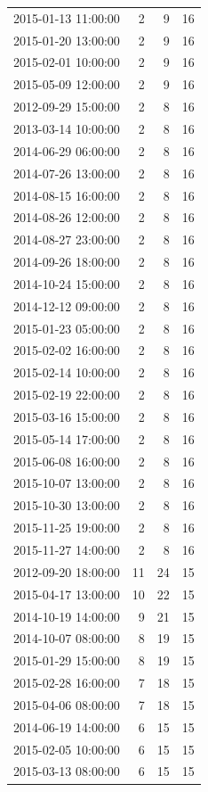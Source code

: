 \begin{tabular}{lrrr}
2015-01-13 11:00:00 & 2 & 9 & 16 \\
2015-01-20 13:00:00 & 2 & 9 & 16 \\
2015-02-01 10:00:00 & 2 & 9 & 16 \\
2015-05-09 12:00:00 & 2 & 9 & 16 \\
2012-09-29 15:00:00 & 2 & 8 & 16 \\
2013-03-14 10:00:00 & 2 & 8 & 16 \\
2014-06-29 06:00:00 & 2 & 8 & 16 \\
2014-07-26 13:00:00 & 2 & 8 & 16 \\
2014-08-15 16:00:00 & 2 & 8 & 16 \\
2014-08-26 12:00:00 & 2 & 8 & 16 \\
2014-08-27 23:00:00 & 2 & 8 & 16 \\
2014-09-26 18:00:00 & 2 & 8 & 16 \\
2014-10-24 15:00:00 & 2 & 8 & 16 \\
2014-12-12 09:00:00 & 2 & 8 & 16 \\
2015-01-23 05:00:00 & 2 & 8 & 16 \\
2015-02-02 16:00:00 & 2 & 8 & 16 \\
2015-02-14 10:00:00 & 2 & 8 & 16 \\
2015-02-19 22:00:00 & 2 & 8 & 16 \\
2015-03-16 15:00:00 & 2 & 8 & 16 \\
2015-05-14 17:00:00 & 2 & 8 & 16 \\
2015-06-08 16:00:00 & 2 & 8 & 16 \\
2015-10-07 13:00:00 & 2 & 8 & 16 \\
2015-10-30 13:00:00 & 2 & 8 & 16 \\
2015-11-25 19:00:00 & 2 & 8 & 16 \\
2015-11-27 14:00:00 & 2 & 8 & 16 \\
2012-09-20 18:00:00 & 11 & 24 & 15 \\
2015-04-17 13:00:00 & 10 & 22 & 15 \\
2014-10-19 14:00:00 & 9 & 21 & 15 \\
2014-10-07 08:00:00 & 8 & 19 & 15 \\
2015-01-29 15:00:00 & 8 & 19 & 15 \\
2015-02-28 16:00:00 & 7 & 18 & 15 \\
2015-04-06 08:00:00 & 7 & 18 & 15 \\
2014-06-19 14:00:00 & 6 & 15 & 15 \\
2015-02-05 10:00:00 & 6 & 15 & 15 \\
2015-03-13 08:00:00 & 6 & 15 & 15 \\

\end{tabular}

